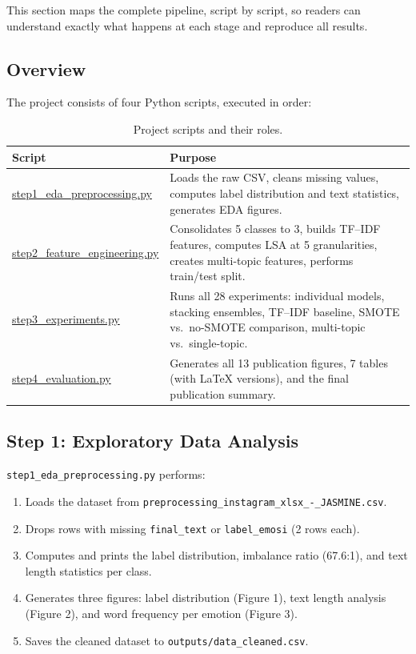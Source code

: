 \documentclass[12pt,a4paper,twoside]{article}
\theoremstyle{definition}
\begin{document}
This section maps the complete pipeline, script by script, so readers can understand exactly what happens at each stage and reproduce all results.

\subsection{Overview}

The project consists of four Python scripts, executed in order:


\begin{table}[h]
\centering
\caption{Project scripts and their roles.}
\label{tab:scripts}
\begin{tabular}{p{4.5cm}p{9cm}}
\toprule
\textbf{Script} & \textbf{Purpose} \\
\midrule
\url{step1_eda_preprocessing.py} & Loads the raw CSV, cleans missing values, computes label distribution and text statistics, generates EDA figures. \\ \addlinespace
\url{step2_feature_engineering.py} & Consolidates 5 classes to 3, builds TF--IDF features, computes LSA at 5 granularities, creates multi-topic features, performs train/test split. \\ \addlinespace
\url{step3_experiments.py} & Runs all 28 experiments: individual models, stacking ensembles, TF--IDF baseline, SMOTE vs.\ no-SMOTE comparison, multi-topic vs.\ single-topic. \\ \addlinespace
\url{step4_evaluation.py} & Generates all 13 publication figures, 7 tables (with LaTeX versions), and the final publication summary. \\
\bottomrule
\end{tabular}
\end{table}



\subsection{Step 1: Exploratory Data Analysis}

\texttt{step1\_eda\_preprocessing.py} performs:

\begin{enumerate}[leftmargin=2em]
    \item Loads the dataset from \texttt{preprocessing\_instagram\_xlsx\_-\_JASMINE.csv}.
    \item Drops rows with missing \texttt{final\_text} or \texttt{label\_emosi} (2 rows each).
    \item Computes and prints the label distribution, imbalance ratio (67.6:1), and text length statistics per class.
    \item Generates three figures: label distribution (Figure 1), text length analysis (Figure 2), and word frequency per emotion (Figure 3).
    \item Saves the cleaned dataset to \texttt{outputs/data\_cleaned.csv}.
\end{enumerate}
\end{document}
